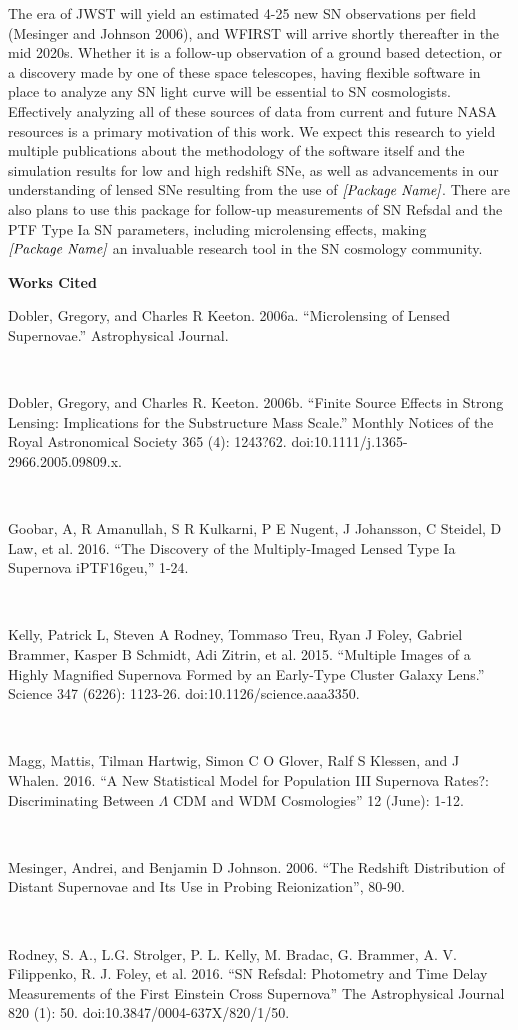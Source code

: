 The era of JWST will yield an estimated 4-25 new SN observations per field (Mesinger and Johnson 2006), and WFIRST will arrive shortly thereafter in the mid 2020s. Whether it is a follow-up observation of a ground based detection, or a discovery made by one of these space telescopes, having flexible software in place to analyze any SN light curve will be essential to SN cosmologists. Effectively analyzing all of these sources of data from current and future NASA resources is a primary motivation of this work. We expect this research to yield multiple publications about the methodology of the software itself and the simulation results for low and high redshift SNe, as well as advancements in our understanding of lensed SNe resulting from the use of $\textit{[Package Name]}$. There are also plans to use this package for follow-up measurements of SN Refsdal and the PTF Type Ia SN parameters, including microlensing effects, making $\textit{[Package Name]}$ an invaluable research tool in the SN cosmology community. 

\pagebreak



\textbf{Works Cited}

Dobler, Gregory, and Charles R Keeton. 2006a. ``Microlensing of Lensed Supernovae.'' Astrophysical Journal.

\

Dobler, Gregory, and Charles R. Keeton. 2006b. ``Finite Source Effects in Strong Lensing: Implications for the Substructure Mass Scale.'' Monthly Notices of the Royal Astronomical Society 365 (4): 1243?62. doi:10.1111/j.1365-2966.2005.09809.x.

\

Goobar, A, R Amanullah, S R Kulkarni, P E Nugent, J Johansson, C Steidel, D Law, et al. 2016. ``The Discovery of the Multiply-Imaged Lensed Type Ia Supernova iPTF16geu,'' 1-24.

\

Kelly, Patrick L, Steven A Rodney, Tommaso Treu, Ryan J Foley, Gabriel Brammer, Kasper B Schmidt, Adi Zitrin, et al. 2015. ``Multiple Images of a Highly Magnified Supernova Formed by an Early-Type Cluster Galaxy Lens.'' Science 347 (6226): 1123-26. doi:10.1126/science.aaa3350.

\

Magg, Mattis, Tilman Hartwig, Simon C O Glover, Ralf S Klessen, and J Whalen. 2016. ``A New Statistical Model for Population III Supernova Rates?: Discriminating Between $\Lambda$ CDM and WDM Cosmologies'' 12 (June): 1-12.

\

Mesinger, Andrei, and Benjamin D Johnson. 2006. ``The Redshift Distribution of Distant Supernovae and Its Use in Probing Reionization'', 80-90.

\

Rodney, S. A., L.G. Strolger, P. L. Kelly, M. Bradac, G. Brammer, A. V. Filippenko, R. J. Foley, et al. 2016. ``SN Refsdal: Photometry and Time Delay Measurements of the First Einstein Cross Supernova'' The Astrophysical Journal 820 (1): 50. doi:10.3847/0004-637X/820/1/50.







